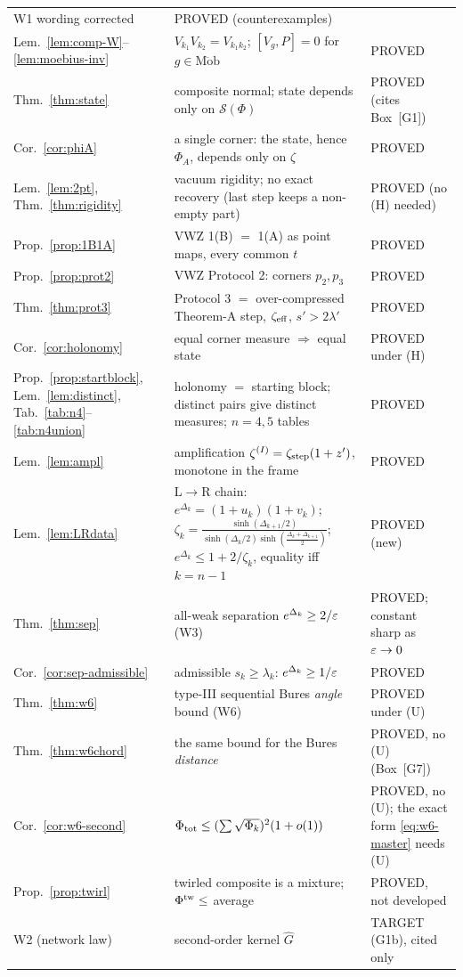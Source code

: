 \documentclass[11pt]{article}
\newcommand{\Sch}{\mathcal S}
\newcommand{\Mob}{\operatorname{M\ddot ob}}
\theoremstyle{definition}\newtheorem{example}[theorem]{Example}
\begin{document}
\begin{table}[h]
\begin{tabular}{@{}lll@{}}
 W1 wording corrected & PROVED (counterexamples)\\
Lem.~\ref{lem:comp-W}--\ref{lem:moebius-inv} & $V_{k_1}V_{k_2}=V_{k_1k_2}$; $[V_g,P]=0$ for
 $g\in\Mob$ & PROVED\\
Thm.~\ref{thm:state} & composite normal; state depends only on $\Sch(\Phi)$ & PROVED
 (cites Box~[G1])\\
Cor.~\ref{cor:phiA} & a single corner: the state, hence $\Phi_A$, depends only on $\zeta$ &
 PROVED\\
Lem.~\ref{lem:2pt}, Thm.~\ref{thm:rigidity} & vacuum rigidity; no exact recovery (last step keeps a non-empty part) &
 PROVED (no (H) needed)\\
Prop.~\ref{prop:1B1A} & VWZ 1(B) $=$ 1(A) as point maps, every common $t$ & PROVED\\
Prop.~\ref{prop:prot2} & VWZ Protocol 2: corners $p_2,p_3$ & PROVED\\
Thm.~\ref{thm:prot3} & Protocol 3 $=$ over-compressed Theorem-A step, $\zeta_{\rm eff}$,
 $s'>2\lambda'$ & PROVED\\
Cor.~\ref{cor:holonomy} & equal corner measure $\Rightarrow$ equal state & PROVED under (H)\\
Prop.~\ref{prop:startblock}, Lem.~\ref{lem:distinct}, Tab.~\ref{tab:n4}--\ref{tab:n4union} &
 holonomy $=$ starting block; distinct pairs give distinct measures; $n=4,5$ tables & PROVED\\
Lem.~\ref{lem:ampl} & amplification $\zeta^{(I)}=\zeta_{\rm step}(1+z')$, monotone in the frame &
 PROVED\\
Lem.~\ref{lem:LRdata} & L$\to$R chain: $e^{\Delta_k}=(1+u_k)(1+v_k)$;
 $\zeta_k=\frac{\sinh(\Delta_{k+1}/2)}{\sinh(\Delta_k/2)\sinh(\frac{\Delta_k+\Delta_{k+1}}2)}$;
 $e^{\Delta_k}\le1+2/\zeta_k$, equality iff $k=n-1$ & PROVED (new)\\
Thm.~\ref{thm:sep} & all-weak separation $e^{\Delta_k}\ge2/\varepsilon$ (W3) & PROVED; constant sharp
 as $\varepsilon\to0$\\
Cor.~\ref{cor:sep-admissible} & admissible $s_k\ge\lambda_k$: $e^{\Delta_k}\ge1/\varepsilon$ & PROVED\\
Thm.~\ref{thm:w6} & type-III sequential Bures \emph{angle} bound (W6) & PROVED under (U)\\
Thm.~\ref{thm:w6chord} & the same bound for the Bures \emph{distance} & PROVED, no (U)
 (Box~[G7])\\
Cor.~\ref{cor:w6-second} & $\Phi_{\rm tot}\le(\sum\sqrt{\Phi_k})^2(1+o(1))$ & PROVED, no (U);
 the exact form \eqref{eq:w6-master} needs (U)\\
Prop.~\ref{prop:twirl} & twirled composite is a mixture; $\Phi^{\rm tw}\le$ average & PROVED,
 not developed\\
W2 (network law) & second-order kernel $\hat G$ & TARGET (G1b), cited only\\
\bottomrule
\end{tabular}
\end{table}
\end{document}
